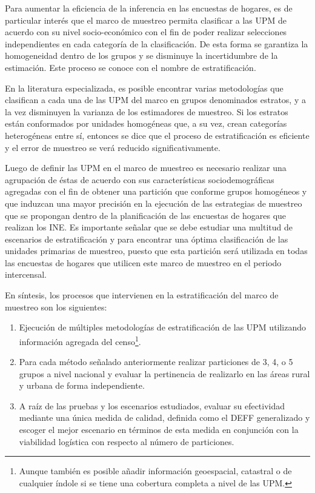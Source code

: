 \documentclass[
  12pt,
]{book}
\providecommand{\tightlist}{%
  \setlength{\itemsep}{0pt}\setlength{\parskip}{0pt}}
\begin{document}
Para aumentar la eficiencia de la inferencia en las encuestas de hogares, es de particular interés que el marco de muestreo permita clasificar a las UPM de acuerdo con su nivel socio-económico con el fin de poder realizar selecciones independientes en cada categoría de la clasificación. De esta forma se garantiza la homogeneidad dentro de los grupos y se disminuye la incertidumbre de la estimación. Este proceso se conoce con el nombre de estratificación.

En la literatura especializada, es posible encontrar varias metodologías que clasifican a cada una de las UPM del marco en grupos denominados estratos, y a la vez disminuyen la varianza de los estimadores de muestreo. Si los estratos están conformados por unidades homogéneas que, a su vez, crean categorías heterogéneas entre sí, entonces se dice que el proceso de estratificación es eficiente y el error de muestreo se verá reducido significativamente.

Luego de definir las UPM en el marco de muestreo es necesario realizar una agrupación de éstas de acuerdo con sus características sociodemográficas agregadas con el fin de obtener una partición que conforme grupos homogéneos y que induzcan una mayor precisión en la ejecución de las estrategias de muestreo que se propongan dentro de la planificación de las encuestas de hogares que realizan los INE. Es importante señalar que se debe estudiar una multitud de escenarios de estratificación y para encontrar una óptima clasificación de las unidades primarias de muestreo, puesto que esta partición será utilizada en todas las encuestas de hogares que utilicen este marco de muestreo en el periodo intercensal.

En síntesis, los procesos que intervienen en la estratificación del marco de muestreo son los siguientes:

\begin{enumerate}
\def\labelenumi{\arabic{enumi}.}
\tightlist
\item
  Ejecución de múltiples metodologías de estratificación de las UPM utilizando información agregada del censo\footnote{Aunque también es posible añadir información geoespacial, catastral o de cualquier índole si se tiene una cobertura completa a nivel de las UPM.}.
\item
  Para cada método señalado anteriormente realizar particiones de 3, 4, o 5 grupos a nivel nacional y evaluar la pertinencia de realizarlo en las áreas rural y urbana de forma independiente.
\item
  A raíz de las pruebas y los escenarios estudiados, evaluar su efectividad mediante una única medida de calidad, definida como el DEFF generalizado y escoger el mejor escenario en términos de esta medida en conjunción con la viabilidad logística con respecto al número de particiones.
\end{enumerate}
\end{document}
